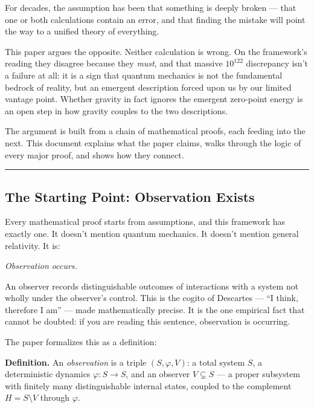 \documentclass[
]{article}
\begin{document}
For decades, the assumption has been that something is deeply broken ---
that one or both calculations contain an error, and that finding the
mistake will point the way to a unified theory of everything.

This paper argues the opposite. Neither calculation is wrong. On the
framework's reading they disagree because they \emph{must}, and that
massive \(10^{122}\) discrepancy isn't a failure at all: it is a sign
that quantum mechanics is not the fundamental bedrock of reality, but an
emergent description forced upon us by our limited vantage point.
Whether gravity in fact ignores the emergent zero-point energy is an
open step in how gravity couples to the two descriptions.

The argument is built from a chain of mathematical proofs, each feeding
into the next. This document explains what the paper claims, walks
through the logic of every major proof, and shows how they connect.

\begin{center}\rule{0.5\linewidth}{0.5pt}\end{center}

\hypertarget{the-starting-point-observation-exists}{%
\subsection{The Starting Point: Observation
Exists}\label{the-starting-point-observation-exists}}

Every mathematical proof starts from assumptions, and this framework has
exactly one. It doesn't mention quantum mechanics. It doesn't mention
general relativity. It is:

\emph{Observation occurs.}

An observer records distinguishable outcomes of interactions with a
system not wholly under the observer's control. This is the cogito of
Descartes --- ``I think, therefore I am'' --- made mathematically
precise. It is the one empirical fact that cannot be doubted: if you are
reading this sentence, observation is occurring.

The paper formalizes this as a definition:

\textbf{Definition.} An \emph{observation} is a triple
\((S, \varphi, V)\): a total system \(S\), a deterministic dynamics
\(\varphi: S \to S\), and an observer \(V \subsetneq S\) --- a proper
subsystem with finitely many distinguishable internal states, coupled to
the complement \(H = S \setminus V\) through \(\varphi\).
\end{document}
